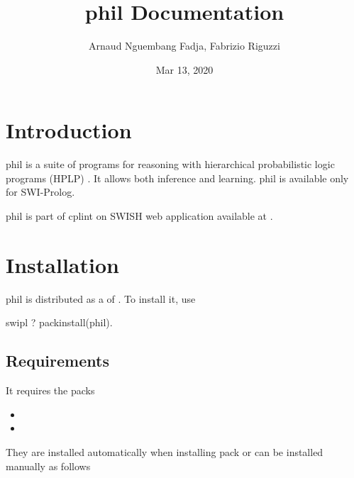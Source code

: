 \documentclass[letterpaper,10pt,english]{sphinxmanual}
\title{phil Documentation}
\date{Mar 13, 2020}
\author{Arnaud Nguembang Fadja, Fabrizio Riguzzi}
\begin{document}
\maketitle
\sphinxtableofcontents
{}\label{\detokenize{index::doc}}



\chapter{Introduction}
\label{\detokenize{index:introduction}}\label{\detokenize{index:phil-on-swish-manual-swi-prolog-version}}
phil is a suite of programs for reasoning with hierarchical probabilistic logic programs (HPLP) \label{\detokenize{index:id1}}{\hyperref[\detokenize{index:ngulamrig17-plp-iw}]{\sphinxcrossref{{[}NguembangFadjaLR17{]}}}}.
It allows both inference and learning. phil is available only for SWI-Prolog.

phil is part of cplint on SWISH web application available at .


\chapter{Installation}
\label{\detokenize{index:installation}}
phil is distributed as a  of .
To install it, use

%
\begin{sphinxVerbatim}[commandchars=\\\{\}]
\PYGZdl{} swipl
?\PYGZhy{} pack\PYGZus{}install(phil).
\end{sphinxVerbatim}


\section{Requirements}
\label{\detokenize{index:requirements}}
It requires the packs
\begin{itemize}
\item {} 

\item {} 

\end{itemize}

They are installed automatically when installing pack  or can be installed manually as follows
\end{document}
